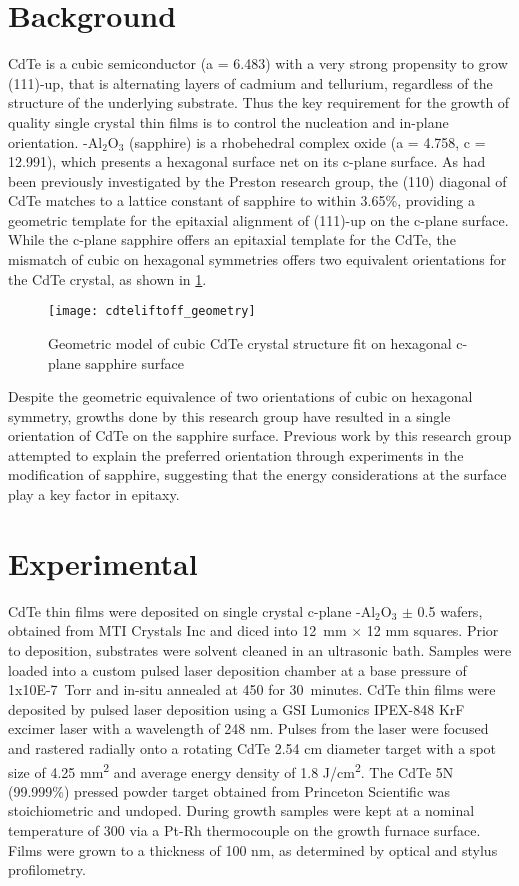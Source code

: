 \section{Background}
CdTe is a cubic semiconductor (a = 6.483) with a very strong propensity to grow 
(111)-up, that is 
alternating layers of cadmium and tellurium, regardless of the structure of the 
underlying substrate. Thus the key requirement for the growth of quality single crystal 
thin films is to control the nucleation and in-plane orientation. \textalpha-Al\(_2\)O\(_3\) 
(sapphire) 
is a rhobehedral complex oxide (a = 4.758, c = 12.991), which presents a hexagonal surface net 
on its c-plane surface. As had been previously investigated by the Preston research 
group, the (110) diagonal of CdTe matches to a lattice constant of sapphire to within 
3.65\%, providing a geometric template for the epitaxial alignment of (111)-up on the 
c-plane surface. While the c-plane sapphire offers an epitaxial template for the CdTe, 
the mismatch of cubic on hexagonal symmetries offers two equivalent orientations for the 
CdTe crystal, as shown in \cref{fig:cdteliftoff_geometry}.
\begin{figure}
    \centering
    \texttt{[image: cdteliftoff\_geometry]}
    \caption{\label{fig:cdteliftoff_geometry}Geometric model of cubic CdTe crystal 
    structure fit on hexagonal c-plane sapphire surface}
\end{figure}
Despite the geometric equivalence of two orientations of cubic on hexagonal symmetry, 
growths done by this research group have resulted in a single orientation of CdTe on the 
sapphire surface. Previous work by this research group attempted to explain the preferred 
orientation through experiments in the modification of sapphire\cite{Neretina2009b}, 
suggesting that the energy considerations at the surface play a key factor in epitaxy.
\section{Experimental}
CdTe thin films were deposited on single crystal c-plane \textalpha-Al\(_2\)O\(_3\) \(\pm\) 
0.5\degree{} wafers, obtained from MTI Crystals Inc and diced into 12~mm \(\times\) 12 mm 
squares. Prior to deposition, substrates were solvent cleaned in an ultrasonic bath. 
Samples were loaded into a custom pulsed laser deposition chamber at a base pressure of 
1x10E-7~Torr and in-situ annealed at 450\celsius{} for 30~minutes. CdTe thin films 
were deposited by pulsed laser deposition using a GSI Lumonics IPEX-848 KrF excimer laser 
with a wavelength of 248 nm. Pulses from the laser were focused and rastered radially 
onto a rotating CdTe 2.54 cm diameter target with a spot size of 4.25 
mm\textsuperscript{2} and average 
energy density of 1.8 J/cm\textsuperscript{2}. The CdTe 5N (99.999\%) pressed powder 
target obtained from 
Princeton Scientific was stoichiometric and undoped. During growth samples were kept at a 
nominal temperature of 300\celsius{} via a Pt-Rh thermocouple on the growth furnace 
surface. 
Films were grown to a thickness of 100 nm, as determined by optical and stylus 
profilometry.

